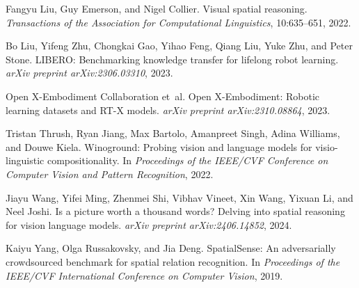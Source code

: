 \documentclass{article}
\begin{document}
\begin{thebibliography}{}
Fangyu Liu, Guy Emerson, and Nigel Collier.
\newblock Visual spatial reasoning.
\newblock \emph{Transactions of the Association for Computational Linguistics}, 10:635--651, 2022.

Bo Liu, Yifeng Zhu, Chongkai Gao, Yihao Feng, Qiang Liu, Yuke Zhu, and Peter Stone.
\newblock LIBERO: Benchmarking knowledge transfer for lifelong robot learning.
\newblock \emph{arXiv preprint arXiv:2306.03310}, 2023.

Open X-Embodiment Collaboration et~al.
\newblock Open X-Embodiment: Robotic learning datasets and RT-X models.
\newblock \emph{arXiv preprint arXiv:2310.08864}, 2023.

Tristan Thrush, Ryan Jiang, Max Bartolo, Amanpreet Singh, Adina Williams, and Douwe Kiela.
\newblock Winoground: Probing vision and language models for visio-linguistic compositionality.
\newblock In \emph{Proceedings of the IEEE/CVF Conference on Computer Vision and Pattern Recognition}, 2022.

Jiayu Wang, Yifei Ming, Zhenmei Shi, Vibhav Vineet, Xin Wang, Yixuan Li, and Neel Joshi.
\newblock Is a picture worth a thousand words? Delving into spatial reasoning for vision language models.
\newblock \emph{arXiv preprint arXiv:2406.14852}, 2024.

Kaiyu Yang, Olga Russakovsky, and Jia Deng.
\newblock SpatialSense: An adversarially crowdsourced benchmark for spatial relation recognition.
\newblock In \emph{Proceedings of the IEEE/CVF International Conference on Computer Vision}, 2019.

\end{thebibliography}

\newpage

\end{document}
